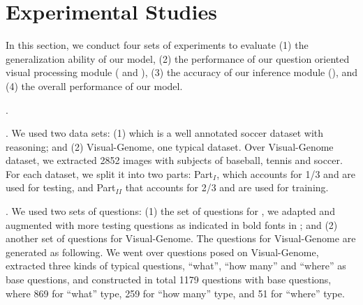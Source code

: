 
\section{Experimental Studies}
\label{sec-expt}

In this section, we conduct four sets of experiments to evaluate (1) the generalization ability of our model, (2) the performance of our question oriented visual processing module ( and ), (3) the accuracy of our inference module (), and (4) the overall performance of our model. 

. %

. We used two data sets: (1)  which is a well annotated soccer dataset with reasoning; and (2) Visual-Genome, one typical \vqa dataset. Over Visual-Genome dataset, we extracted 2852 images with subjects of baseball, tennis and soccer. 
For each dataset, we split it into two parts: Part$_I$, which accounts for 1/3 and are used for testing, and Part$_{II}$ that accounts for 2/3 and are used for training.   

. We used two sets of questions: (1) the set of questions for , we adapted and augmented with more testing questions as indicated in bold fonts in ; and (2) another set of questions for Visual-Genome. The questions for Visual-Genome are generated as following. We went over questions posed on Visual-Genome, extracted three kinds of typical questions, \ie ``what'', ``how many'' and ``where'' as base questions, and constructed in total 1179 questions with base questions, where 869 for ``what'' type, 259 for ``how many'' type, and 51 for ``where'' type. 

